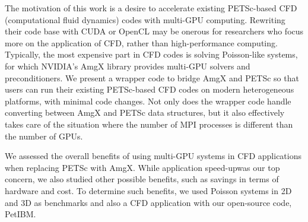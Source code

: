 The motivation of this work is a desire to accelerate existing 
PETSc\cite{petsc-web-page}-based CFD (computational fluid dynamics) codes with multi-GPU computing.
Rewriting their code base with CUDA or OpenCL may be onerous
for researchers who focus more on the application of CFD, rather than high-performance computing.
Typically, the most expensive part in CFD codes is solving Poisson-like systems,
for which NVIDIA's AmgX\cite{amgx-web-page} library provides multi-GPU solvers and preconditioners.
We present a wrapper code to bridge AmgX and PETSc so that users can 
run their existing PETSc-based CFD codes on modern heterogeneous platforms, 
with minimal code changes.
Not only does the wrapper code handle converting between AmgX and PETSc
data structures, but it also effectively takes care of the situation where the number
of MPI processes is different than the number of GPUs.

We assessed the overall benefits of using multi-GPU systems in CFD applications
when replacing PETSc with AmgX.
While application speed-up\footnotemark was our top concern, we also studied 
other possible benefits, such as savings in terms of hardware and cost.
To determine such benefits, we used Poisson systems in 2D and 3D as benchmarks
and also a CFD application with our open-source code, PetIBM.

